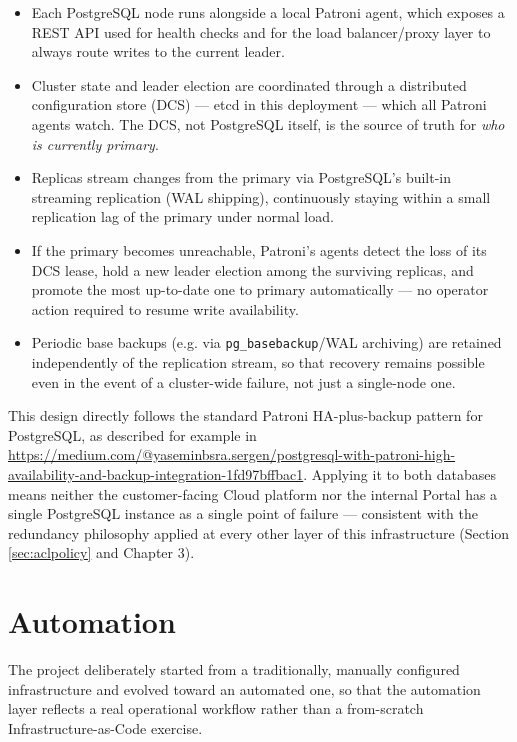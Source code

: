 \documentclass[11pt,a4paper]{report}
\begin{document}
\begin{itemize}[leftmargin=1.5em]
  \item Each PostgreSQL node runs alongside a local Patroni agent, which
    exposes a REST API used for health checks and for the load
    balancer/proxy layer to always route writes to the current leader.
  \item Cluster state and leader election are coordinated through a
    distributed configuration store (DCS) --- etcd in this deployment ---
    which all Patroni agents watch. The DCS, not PostgreSQL itself, is the
    source of truth for \emph{who is currently primary}.
  \item Replicas stream changes from the primary via PostgreSQL's built-in
    streaming replication (WAL shipping), continuously staying within a
    small replication lag of the primary under normal load.
  \item If the primary becomes unreachable, Patroni's agents detect the
    loss of its DCS lease, hold a new leader election among the surviving
    replicas, and promote the most up-to-date one to primary automatically
    --- no operator action required to resume write availability.
  \item Periodic base backups (e.g. via \texttt{pg\_basebackup}/WAL
    archiving) are retained independently of the replication stream, so
    that recovery remains possible even in the event of a
    cluster-wide failure, not just a single-node one.
\end{itemize}

This design directly follows the standard Patroni HA-plus-backup pattern
for PostgreSQL, as described for example in
\url{https://medium.com/@yaseminbsra.sergen/postgresql-with-patroni-high-availability-and-backup-integration-1fd97bffbac1}.
Applying it to both databases means neither the customer-facing Cloud
platform nor the internal Portal has a single PostgreSQL instance as a
single point of failure --- consistent with the redundancy philosophy
applied at every other layer of this infrastructure (Section
\ref{sec:aclpolicy} and Chapter 3).

\chapter{Automation}

The project deliberately started from a traditionally, manually configured
infrastructure and evolved toward an automated one, so that the automation
layer reflects a real operational workflow rather than a from-scratch
Infrastructure-as-Code exercise.
\end{document}

